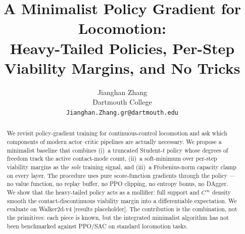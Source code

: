 \documentclass{article}
\title{A Minimalist Policy Gradient for Locomotion:\\
Heavy-Tailed Policies, Per-Step Viability Margins, and No Tricks}
\author{%
  Jianghan Zhang \\
  Dartmouth College \\
  \texttt{Jianghan.Zhang.gr@dartmouth.edu}
}
\theoremstyle{plain}
\theoremstyle{definition}
\theoremstyle{remark}
\begin{document}
\maketitle

\begin{abstract}
We revisit policy-gradient training for continuous-control locomotion and ask
which components of modern actor--critic pipelines are actually necessary.
We propose a minimalist baseline that combines (i)~a truncated Student-$t$
policy whose degrees of freedom track the active contact-mode count,
(ii)~a soft-minimum over per-step viability margins as the \emph{sole}
training signal, and (iii)~a Frobenius-norm capacity clamp on every layer.
The procedure uses pure score-function gradients through the policy ---
no value function, no replay buffer, no PPO clipping, no entropy bonus,
no DAgger. We show that the heavy-tailed policy acts as a mollifier: full
support and $C^\infty$ density smooth the contact-discontinuous viability
margin into a differentiable expectation. We evaluate on Walker2d-v4
[results placeholder]. The contribution is the combination, not the
primitives: each piece is known, but the integrated minimalist algorithm
has not been benchmarked against PPO/SAC on standard locomotion tasks.
\end{abstract}










\end{document}
